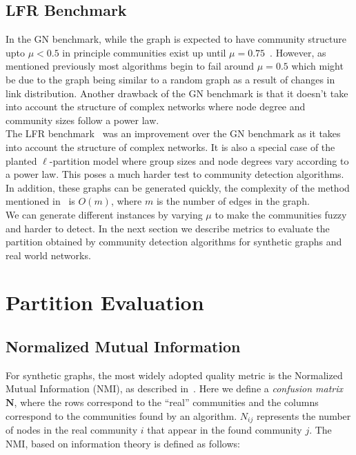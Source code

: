 \begin{spacing}{1.5}
\subsection{LFR Benchmark}

In the GN benchmark, while the graph is expected to have community structure upto $\mu < 0.5$ in principle communities exist up until $\mu = 0.75$~\cite{PhysRevE.78.046110}. However, as mentioned previously most algorithms begin to fail around $\mu = 0.5$ which might be due to the graph being similar to a random graph as a result of changes in link distribution. Another drawback of the GN benchmark is that it doesn't take into account the structure of complex networks where node degree and community sizes follow a power law.\\
\indent The LFR benchmark~\cite{PhysRevE.78.046110} was an improvement over the GN benchmark as it takes into account the structure of complex networks. It is also a special case of the planted $\ell$-partition model where group sizes and node degrees vary according to a power law. This poses a much harder test to community detection algorithms. In addition, these graphs can be generated quickly, the complexity of the method mentioned in~\cite{PhysRevE.78.046110} is $O(m)$, where $m$ is the number of edges in the graph.\\
\indent We can generate different instances by varying $\mu$ to make the communities fuzzy and harder to detect. In the next section we describe metrics to evaluate the partition obtained by community detection algorithms for synthetic graphs and real world networks.

\section{Partition Evaluation}

\subsection{Normalized Mutual Information}

For synthetic graphs, the most widely adopted quality metric is the Normalized Mutual Information (NMI), as described in~\cite{Danon05comparingcommunity}. Here we define a \emph{confusion matrix} $\mathbf{N}$, where the rows correspond to the ``real'' communities and the columns correspond to the communities found by an algorithm. $N_{ij}$ represents the number of nodes in the real community $i$ that appear in the found community $j$. The NMI, based on information theory is defined as follows:


\end{spacing}
